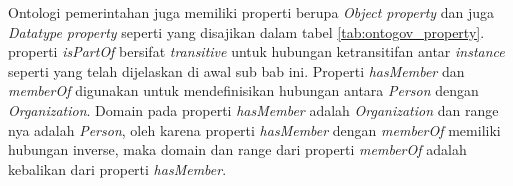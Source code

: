 Ontologi pemerintahan juga memiliki properti berupa \emph{Object property} dan juga \emph{Datatype property} seperti yang disajikan dalam tabel \ref{tab:ontogov_property}. properti \emph{isPartOf} bersifat \emph{transitive} untuk hubungan ketransitifan antar \emph{instance} seperti yang telah dijelaskan di awal sub bab ini. Properti \emph{hasMember} dan \emph{memberOf} digunakan untuk mendefinisikan hubungan antara \emph{Person} dengan \emph{Organization}. Domain pada properti \emph{hasMember} adalah \emph{Organization} dan range nya adalah \emph{Person}, oleh karena properti \emph{hasMember} dengan \emph{memberOf} memiliki hubungan inverse, maka domain dan range dari properti \emph{memberOf} adalah kebalikan dari properti \emph{hasMember}.